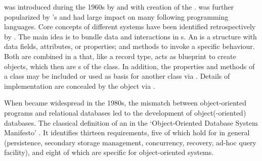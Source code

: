  was introduced during the 1960s by
 and  with creation 
of the  
\cite{Holmevik1994}.  was
further popularized by 's  and had large impact on many following programming
languages. Core concepts of different  systems have been identified
retrospectively by \textcite{Armstrong2006}. The main idea is to bundle data 
and interactions in s. An  is a structure with data
fields, attributes, or properties; and methods to invoke a specific
behaviour. Both are combined in a  that, like a record type, acts
as blueprint to create objects, which then are s of the class.
In addition, the properties and methods of a class may be included or used as
basis for another class via . Details of implementation are
concealed by the object via .

When  became widespread in the 1980s, the mismatch between
object-oriented programs and relational databases led to the development
of object(-oriented) databases. The classical definition of an  in the `Object-Oriented Database
System Manifesto' \cite{Atkinson1989}.  It identifies thirteen 
requirements, five of which hold for  in general (persistence,
secondary storage management, concurrency, recovery, ad-hoc query facility),
and eight of which are specific for object-oriented systems. 

